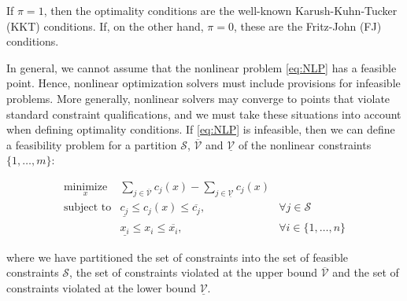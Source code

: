 If $\pi = 1$, then the optimality conditions are the well-known Karush-Kuhn-Tucker (KKT) conditions. If, on the other hand,
$\pi = 0$, these are the Fritz-John (FJ) conditions.

In general, we cannot assume that the nonlinear problem \eqref{eq:NLP} has a feasible point. Hence, nonlinear optimization
solvers must include provisions for infeasible problems. More generally, nonlinear solvers may converge to points that violate
standard constraint qualifications, and we must take these situations into account when defining optimality conditions.
If \eqref{eq:NLP} is infeasible, then we can define a feasibility problem for a partition $\mathcal{S}$,
$\overline{\mathcal{V}}$ and $\underline{\mathcal{V}}$ of the nonlinear constraints $\{1, \ldots, m\}$:


\begin{equation}\label{eq:NLPinfeasibility}
\begin{array}{lll}
\underset{x}{\text{minimize}} 	& \sum\limits_{j \in \overline{\mathcal{V}}} c_j(x) - \sum\limits_{j \in \underline{\mathcal{V}}} c_j(x) & \\
\text{subject to} 				& \underline{c_j} \le c_j(x) \le \overline{c_j}, & \forall j \in \mathcal{S} \\
								& \underline{x_i} \le x_i \le \overline{x_i}, & \forall i \in \{1, \ldots, n\}
\end{array}
\end{equation}

where we have partitioned the set of constraints into the set of feasible constraints $\mathcal{S}$, the set of
constraints violated at the upper bound $\overline{\mathcal{V}}$ and the set of constraints violated at the lower bound
$\underline{\mathcal{V}}$.


